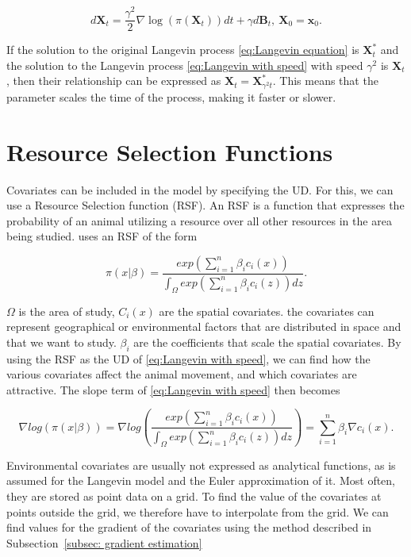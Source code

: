 \begin{equation}
    d\textbf{X}_t = \frac{\gamma^2}{2} \nabla \log(\pi(\textbf{X}_t))dt + \gamma d\textbf{B}_t, \ \textbf{X}_0 = \textbf{x}_0.
    \label{eq:Langevin with speed}
\end{equation}


If the solution to the original Langevin process \eqref{eq:Langevin equation} is $\textbf{X}^*_t$ and the solution to the Langevin process \eqref{eq:Langevin with speed} with speed $\gamma^2$ is $\textbf{X}_t$, then their relationship can be expressed as $\textbf{X}_t = \textbf{X}^*_{\gamma^2 t}$. This means that the parameter scales the time of the process, making it faster or slower.


\section{Resource Selection Functions}

Covariates can be included in the model by specifying the UD. For this, we can use a Resource Selection function (RSF). An RSF is a function that expresses the probability of an animal utilizing a resource over all other resources in the area being studied. \textcite{michelot_langevin_2019} uses an RSF of the form


\begin{equation}
    \pi(x|\beta) = \frac{exp(\sum_{i=1}^n\beta_i c_i(x))}{\int_\Omega exp(\sum_{i=1}^n\beta_i c_i(z))dz}.
    \label{eq: resource selection function}
\end{equation}

$\Omega$ is the area of study, $C_i(x)$ are the spatial covariates. the covariates can represent geographical or environmental factors that are distributed in space and that we want to study. $\beta_i$ are the coefficients that scale the spatial covariates. By using the RSF as the UD of \eqref{eq:Langevin with speed}, we can find how the various covariates affect the animal movement, and which covariates are attractive. The slope term of \eqref{eq:Langevin with speed} then becomes

$$
    \nabla log(\pi(x|\beta)) = \nabla log(\frac{exp(\sum_{i=1}^n\beta_i c_i(x))}{\int_\Omega exp(\sum_{i=1}^n\beta_i c_i(z))dz}) =\sum_{i=1}^n \beta_i \nabla c_i(x).
$$



Environmental covariates are usually not expressed as analytical functions, as is assumed for the Langevin model and the Euler approximation of it. Most often, they are stored as point data on a grid. To find the value of the covariates at points outside the grid, we therefore have to interpolate from the grid. We can find values for the gradient of the covariates using the method described in Subsection~\ref{subsec: gradient estimation}



